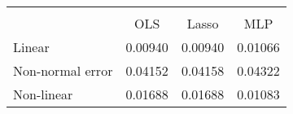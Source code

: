 \begin{tabular}{lccc}
\hline\hline \\ [-1.8ex]
 & OLS & Lasso & MLP \\ 
 \hline 
Linear & 0.00940 & 0.00940 & 0.01066 \\ 
Non-normal error & 0.04152 & 0.04158 & 0.04322 \\ 
Non-linear & 0.01688 & 0.01688 & 0.01083 \\ 
\hline\hline
\end{tabular}